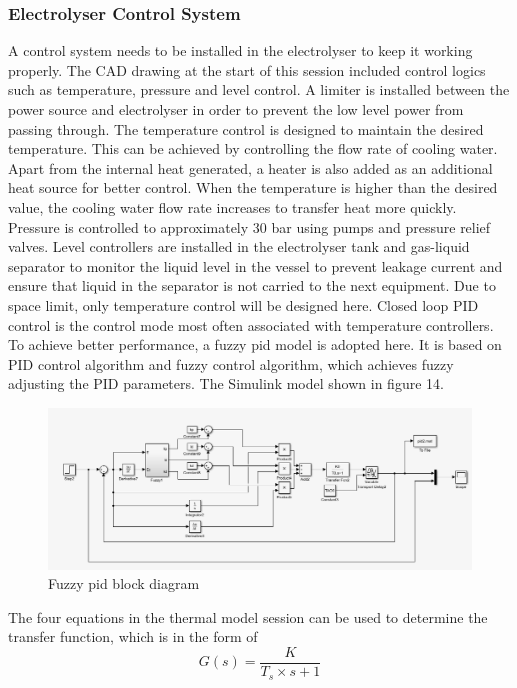 \subsubsection{Electrolyser Control System}
A control system needs to be installed in the electrolyser to keep it working properly. The CAD drawing at the start of this session included control logics such as temperature, pressure and level control.  A limiter is installed between the power source and electrolyser in order to prevent the low level power from passing through. The temperature control is designed to maintain the desired temperature. This can be achieved by controlling the flow rate of cooling water. Apart from the internal heat generated, a heater is also added as an additional heat source for better control. When the temperature is higher than the desired value, the cooling water flow rate increases to transfer heat more quickly.  Pressure is controlled to approximately 30 bar using pumps and pressure relief valves. Level controllers are installed in the electrolyser tank and gas-liquid separator to monitor the liquid level in the vessel to prevent leakage current and ensure that liquid in the separator is not carried to the next equipment. Due to space limit, only temperature control will be designed here. Closed loop PID control is the control mode most often associated with temperature controllers.\cite{control} To achieve better performance, a fuzzy pid model\cite{fuzzy} is adopted here. It is based on PID control algorithm and fuzzy control algorithm, which achieves fuzzy adjusting the PID parameters. The Simulink model shown in figure 14. 
\begin{figure}[H]
\includegraphics[with=10cm]{fuzzypid.png}
\caption{Fuzzy pid block diagram}
\end{figure}
The four equations in the thermal model session can be used to determine the transfer function, which is in the form of 
\begin{equation}
G(s) = \frac{K}{T_s\times s +1} 
\end{equation}
